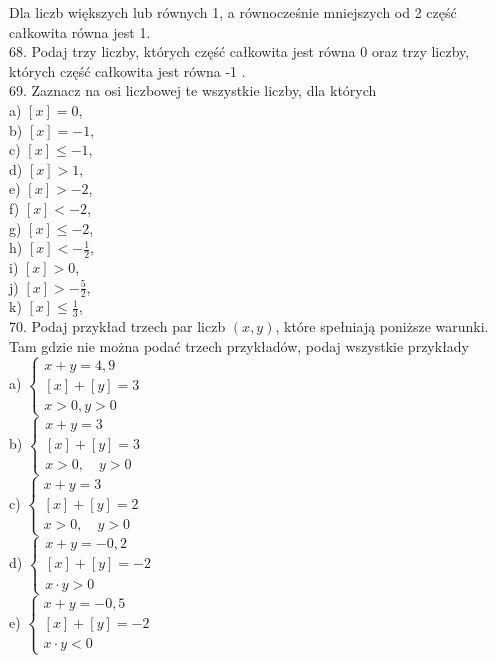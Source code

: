 \documentclass[10pt]{article}
\begin{document}
Dla liczb większych lub równych 1, a równocześnie mniejszych od 2 część całkowita równa jest 1.\\
68. Podaj trzy liczby, których część całkowita jest równa 0 oraz trzy liczby, których część całkowita jest równa -1 .\\
69. Zaznacz na osi liczbowej te wszystkie liczby, dla których\\
a) \([x]=0\),\\
b) \([x]=-1\),\\
c) \([x] \leqslant-1\),\\
d) \([x]>1\),\\
e) \([x]>-2\),\\
f) \([x]<-2\),\\
g) \([x] \leqslant-2\),\\
h) \([x]<-\frac{1}{2}\),\\
i) \([x]>0\),\\
j) \([x]>-\frac{5}{2}\),\\
k) \([x] \leqslant \frac{1}{3}\),\\
70. Podaj przykład trzech par liczb \((x, y)\), które spełniają poniższe warunki. Tam gdzie nie można podać trzech przykładów, podaj wszystkie przykłady\\
a) \(\left\{\begin{array}{l}x+y=4,9 \\ {[x]+[y]=3} \\ x>0, y>0\end{array}\right.\)\\
b) \(\left\{\begin{array}{l}x+y=3 \\ {[x]+[y]=3} \\ x>0, \quad y>0\end{array}\right.\)\\
c) \(\left\{\begin{array}{l}x+y=3 \\ {[x]+[y]=2} \\ x>0, \quad y>0\end{array}\right.\)\\
d) \(\left\{\begin{array}{l}x+y=-0,2 \\ {[x]+[y]=-2} \\ x \cdot y>0\end{array}\right.\)\\
e) \(\left\{\begin{array}{l}x+y=-0,5 \\ {[x]+[y]=-2} \\ x \cdot y<0\end{array}\right.\)\\
\end{document}
